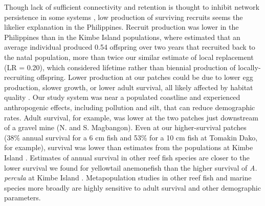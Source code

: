 \documentclass[12pt, oneside]{article}   	%
\begin{document}
Though lack of sufficient connectivity and retention is thought to inhibit network persistence in some systems \citep[e.g., insufficient retention of offspring within reserves for eastern oysters (\textit{Crassostrea virginica}) in North Carolina;][]{puckett2016metapopulation}, low production of surviving recruits seems the likelier explanation in the Philippines. Recruit production was lower in the Philippines than in the Kimbe Island populations, where \cite{salles2020strong} estimated that an average individual produced 0.54 offspring over two years that recruited back to the natal population, more than twice our similar estimate of local replacement (LR = 0.20), which considered lifetime rather than biennial production of locally-recruiting offspring. Lower production at our patches could be due to lower egg production, slower growth, or lower adult survival, all likely affected by habitat quality \citep[e.g.][]{salles2020strong, hayashi2019low}. Our study system was near a populated coastline and experienced anthropogenic effects, including pollution and silt, that can reduce demographic rates. Adult survival, for example, was lower at the two patches just downstream of a gravel mine (N. and S. Magbangon). Even at our higher-survival patches (38\% annual survival for a 6 cm fish and 53\% for a 10 cm fish at Tomakin Dako, for example), survival was lower than estimates from the populations at Kimbe Island \citep[85\% annual survival,][]{salles_coral_2015}. Estimates of annual survival in other reef fish species are closer to the lower survival we found for yellowtail anemonefish than the higher survival of \textit{A. percula} at Kimbe Island \citep[approximately 30\% annual survival for bluehead wrasse (\textit{Thalassoma bifasciatum}) and bicolour damselfish (\textit{Stegastes partitus}), respectively;][]{warner1988population, figueira2008small}. Metapopulation studies in other reef fish \citep[e.g.,][]{figueira2009connectivity} and marine species more broadly \citep{carson2011evaluating} are highly sensitive to adult survival and other demographic parameters.

\end{document}
